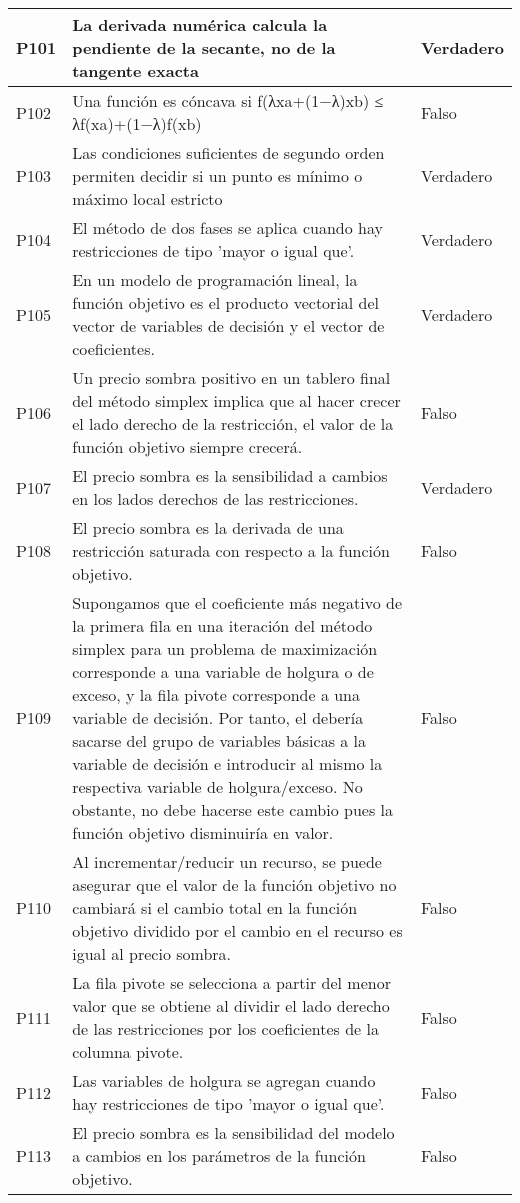 \documentclass{article}
\begin{document}
\begin{longtable}{|>{\centering\arraybackslash}p{1.5cm}|>{\raggedright\arraybackslash}p{14cm}|>{\centering\arraybackslash}p{2cm}|}
\hline
P101 & La derivada numérica calcula la pendiente de la secante, no de la tangente exacta & Verdadero \\
\hline
P102 & Una función es cóncava si f(λxa+(1−λ)xb) ≤ λf(xa)+(1−λ)f(xb) & Falso \\
\hline
P103 & Las condiciones suficientes de segundo orden permiten decidir si un punto es mínimo o máximo local estricto & Verdadero \\
\hline
P104 & El método de dos fases se aplica cuando hay restricciones de tipo 'mayor o igual que'. & Verdadero \\
\hline
P105 & En un modelo de programación lineal, la función objetivo es el producto vectorial del vector de variables de decisión y el vector de coeficientes. & Verdadero \\
\hline
P106 & Un precio sombra positivo en un tablero final del método simplex implica que al hacer crecer el lado derecho de la restricción, el valor de la función objetivo siempre crecerá. & Falso \\
\hline
P107 & El precio sombra es la sensibilidad a cambios en los lados derechos de las restricciones. & Verdadero \\
\hline
P108 & El precio sombra es la derivada de una restricción saturada con respecto a la función objetivo. & Falso \\
\hline
P109 & Supongamos que el coeficiente más negativo de la primera fila en una iteración del método simplex para un problema de maximización corresponde a una variable de holgura o de exceso, y la fila pivote corresponde a una variable de decisión. Por tanto, el debería sacarse del grupo de variables básicas a la variable de decisión e introducir al mismo la respectiva variable de holgura/exceso. No obstante, no debe hacerse este cambio pues la función objetivo disminuiría en valor. & Falso \\
\hline
P110 & Al incrementar/reducir un recurso, se puede asegurar que el valor de la función objetivo no cambiará si el cambio total en la función objetivo dividido por el cambio en el recurso es igual al precio sombra. & Falso \\
\hline
P111 & La fila pivote se selecciona a partir del menor valor que se obtiene al dividir el lado derecho de las restricciones por los coeficientes de la columna pivote. & Falso \\
\hline
P112 & Las variables de holgura se agregan cuando hay restricciones de tipo 'mayor o igual que'. & Falso \\
\hline
P113 & El precio sombra es la sensibilidad del modelo a cambios en los parámetros de la función objetivo. & Falso \\

\end{longtable}
\end{document}
